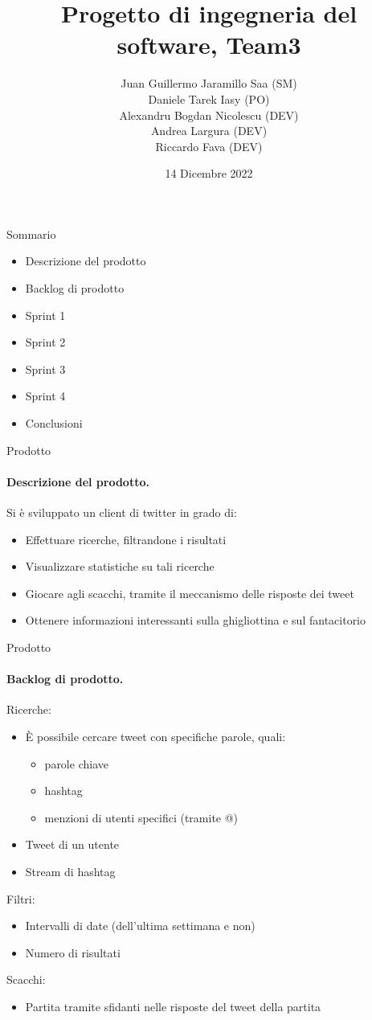 \documentclass[12pt, aspectration=169]{beamer}
\title{Progetto di ingegneria del software, Team3}
\author{Juan Guillermo Jaramillo Saa (SM) \\
        Daniele Tarek Iasy (PO) \\ 
        Alexandru Bogdan Nicolescu (DEV) \\ 
        Andrea Largura (DEV) \\
        Riccardo Fava (DEV)}
\institute[]{Universit\'a di Bologna, Corso di Laurea in Informatica}
\date{14 Dicembre 2022}
\begin{document}
\maketitle
\begin{frame}{Sommario}
\begin{itemize}
    \item Descrizione del prodotto
    \item Backlog di prodotto
    \item Sprint 1
    \item Sprint 2
    \item Sprint 3
    \item Sprint 4
    \item Conclusioni
\end{itemize}
\end{frame}
\begin{frame}{Prodotto}
\framesubtitle{Descrizione del prodotto.}
Si \`e sviluppato un client di twitter in grado di: 
\begin{itemize}
    \item Effettuare ricerche, filtrandone i risultati
    \item Visualizzare statistiche su tali ricerche
    \item Giocare agli scacchi, tramite il meccanismo delle risposte dei tweet
    \item Ottenere informazioni interessanti sulla ghigliottina e sul fantacitorio
\end{itemize}
\end{frame}
\begin{frame}{Prodotto}
\framesubtitle{Backlog di prodotto.}
\begin{multicols}{2}
Ricerche:
\begin{itemize}
\item \`E possibile cercare tweet con specifiche parole, quali:
\begin{itemize}
    \item parole chiave
    \item hashtag
    \item menzioni di utenti specifici (tramite @)
\end{itemize}
\item Tweet di un utente
\item Stream di hashtag
\end{itemize}
\columnbreak

Filtri:
\begin{itemize}
\item Intervalli di date (dell'ultima settimana e non)
\item Numero di risultati
\end{itemize}
Scacchi:
\begin{itemize}
    \item Partita tramite sfidanti nelle risposte del tweet della partita
\end{itemize}
\end{multicols}
\end{frame}
\end{document}

